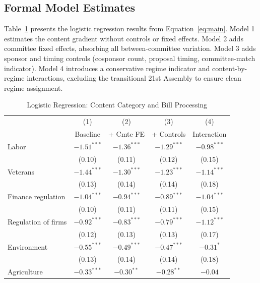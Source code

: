 \documentclass[11pt]{article}
\begin{document}
\subsection{Formal Model Estimates}

Table~\ref{tab:logit} presents the logistic regression results from Equation~\ref{eq:main}. Model 1 estimates the content gradient without controls or fixed effects. Model 2 adds committee fixed effects, absorbing all between-committee variation. Model 3 adds sponsor and timing controls (cosponsor count, proposal timing, committee-match indicator). Model 4 introduces a conservative regime indicator and content-by-regime interactions, excluding the transitional 21st Assembly to ensure clean regime assignment.

\begin{table}[htbp]
\centering
\caption{Logistic Regression: Content Category and Bill Processing}
\label{tab:logit}
\begin{tabular}{lcccc}
\toprule
& (1) & (2) & (3) & (4) \\
& Baseline & + Cmte FE & + Controls & Interaction \\
\midrule
Labor              & $-1.51^{***}$ & $-1.36^{***}$ & $-1.29^{***}$ & $-0.98^{***}$ \\
                   & (0.10)        & (0.11)        & (0.12)        & (0.15)        \\[3pt]
Veterans           & $-1.44^{***}$ & $-1.30^{***}$ & $-1.23^{***}$ & $-1.14^{***}$ \\
                   & (0.13)        & (0.14)        & (0.14)        & (0.18)        \\[3pt]
Finance regulation & $-1.04^{***}$ & $-0.94^{***}$ & $-0.89^{***}$ & $-1.04^{***}$ \\
                   & (0.10)        & (0.11)        & (0.11)        & (0.15)        \\[3pt]
Regulation of firms& $-0.92^{***}$ & $-0.83^{***}$ & $-0.79^{***}$ & $-1.12^{***}$ \\
                   & (0.12)        & (0.13)        & (0.13)        & (0.17)        \\[3pt]
Environment        & $-0.55^{***}$ & $-0.49^{***}$ & $-0.47^{***}$ & $-0.31^{*}$   \\
                   & (0.13)        & (0.14)        & (0.14)        & (0.18)        \\[3pt]
Agriculture        & $-0.33^{***}$ & $-0.30^{**}$  & $-0.28^{**}$  & $-0.04$       \\

\end{tabular}
\end{table}
\end{document}
